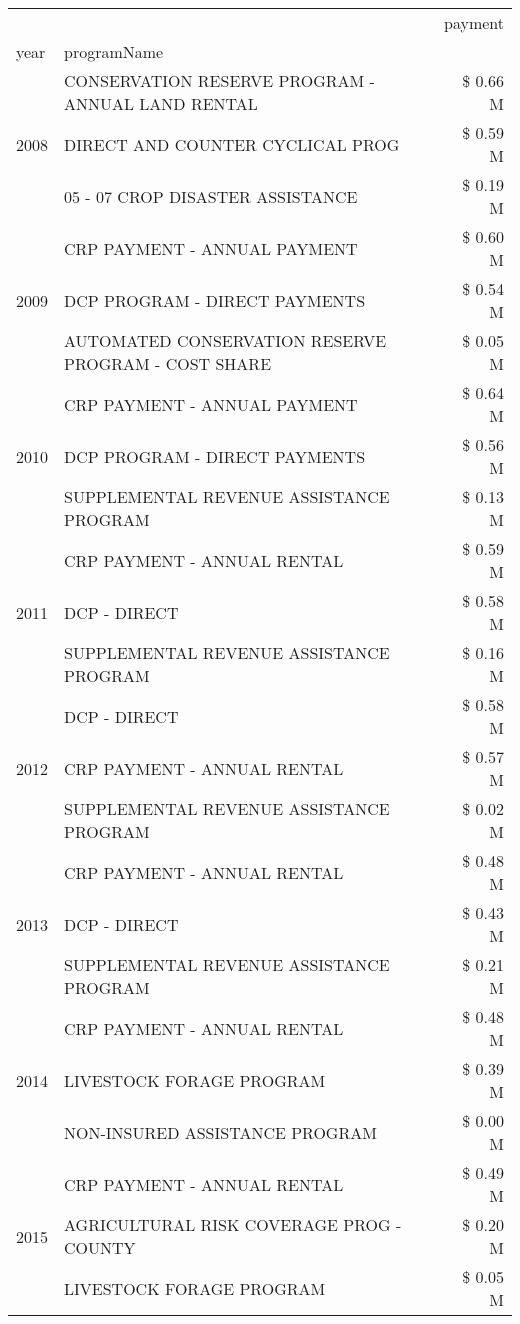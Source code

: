 \begin{tabular}{llr}
\toprule
 &  & payment \\
year & programName &  \\
\midrule
\multirow[t]{3}{*}{2008} & CONSERVATION RESERVE PROGRAM - ANNUAL LAND RENTAL & \$ 0.66 M \\
 & DIRECT AND COUNTER CYCLICAL PROG & \$ 0.59 M \\
 & 05 - 07 CROP DISASTER ASSISTANCE & \$ 0.19 M \\
\cline{1-3}
\multirow[t]{3}{*}{2009} & CRP PAYMENT - ANNUAL PAYMENT & \$ 0.60 M \\
 & DCP PROGRAM - DIRECT PAYMENTS & \$ 0.54 M \\
 & AUTOMATED CONSERVATION RESERVE PROGRAM - COST SHARE & \$ 0.05 M \\
\cline{1-3}
\multirow[t]{3}{*}{2010} & CRP PAYMENT - ANNUAL PAYMENT & \$ 0.64 M \\
 & DCP PROGRAM - DIRECT PAYMENTS & \$ 0.56 M \\
 & SUPPLEMENTAL REVENUE ASSISTANCE PROGRAM & \$ 0.13 M \\
\cline{1-3}
\multirow[t]{3}{*}{2011} & CRP PAYMENT - ANNUAL RENTAL & \$ 0.59 M \\
 & DCP - DIRECT & \$ 0.58 M \\
 & SUPPLEMENTAL REVENUE ASSISTANCE PROGRAM & \$ 0.16 M \\
\cline{1-3}
\multirow[t]{3}{*}{2012} & DCP - DIRECT & \$ 0.58 M \\
 & CRP PAYMENT - ANNUAL RENTAL & \$ 0.57 M \\
 & SUPPLEMENTAL REVENUE ASSISTANCE PROGRAM & \$ 0.02 M \\
\cline{1-3}
\multirow[t]{3}{*}{2013} & CRP PAYMENT - ANNUAL RENTAL & \$ 0.48 M \\
 & DCP - DIRECT & \$ 0.43 M \\
 & SUPPLEMENTAL REVENUE ASSISTANCE PROGRAM & \$ 0.21 M \\
\cline{1-3}
\multirow[t]{3}{*}{2014} & CRP PAYMENT - ANNUAL RENTAL & \$ 0.48 M \\
 & LIVESTOCK FORAGE PROGRAM & \$ 0.39 M \\
 & NON-INSURED ASSISTANCE PROGRAM & \$ 0.00 M \\
\cline{1-3}
\multirow[t]{3}{*}{2015} & CRP PAYMENT - ANNUAL RENTAL & \$ 0.49 M \\
 & AGRICULTURAL RISK COVERAGE PROG - COUNTY & \$ 0.20 M \\
 & LIVESTOCK FORAGE PROGRAM & \$ 0.05 M \\

\end{tabular}
